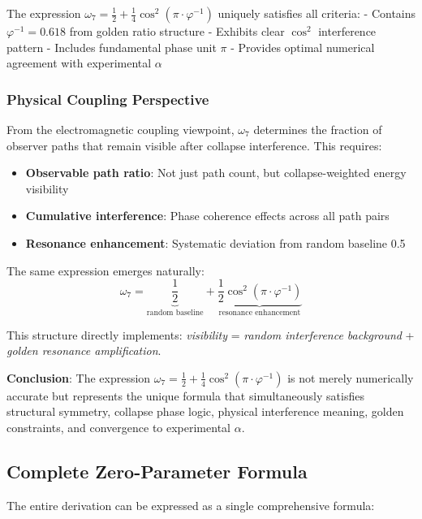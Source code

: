 \documentclass[%
 reprint,
 amsmath,amssymb,
 aps,
 prd,
 10pt,
 nofootinbib,      %
 longbibliography  %
]{revtex4-2}
\theoremstyle{definition}
\theoremstyle{remark}
\begin{document}
The expression $\omega_7 = \frac{1}{2} + \frac{1}{4}\cos^2(\pi \cdot \varphi^{-1})$ uniquely satisfies all criteria:
- Contains $\varphi^{-1} = 0.618$ from golden ratio structure
- Exhibits clear $\cos^2$ interference pattern
- Includes fundamental phase unit $\pi$
- Provides optimal numerical agreement with experimental $\alpha$

\subsubsection{Physical Coupling Perspective}

From the electromagnetic coupling viewpoint, $\omega_7$ determines the fraction of observer paths that remain visible after collapse interference. This requires:

\begin{itemize}
\item \textbf{Observable path ratio}: Not just path count, but collapse-weighted energy visibility
\item \textbf{Cumulative interference}: Phase coherence effects across all path pairs
\item \textbf{Resonance enhancement}: Systematic deviation from random baseline 0.5
\end{itemize}

The same expression emerges naturally:
\begin{equation}
\omega_7 = \underbrace{\frac{1}{2}}_{\text{random baseline}} + \underbrace{\frac{1}{2} \cos^2(\pi \cdot \varphi^{-1})}_{\text{resonance enhancement}}
\end{equation}

This structure directly implements: \textit{visibility} = \textit{random interference background} + \textit{golden resonance amplification}.

\textbf{Conclusion}: The expression $\omega_7 = \frac{1}{2} + \frac{1}{4}\cos^2(\pi \cdot \varphi^{-1})$ is not merely numerically accurate but represents the unique formula that simultaneously satisfies structural symmetry, collapse phase logic, physical interference meaning, golden constraints, and convergence to experimental $\alpha$.

\subsection{Complete Zero-Parameter Formula}

The entire derivation can be expressed as a single comprehensive formula:
\end{document}
